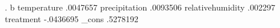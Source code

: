 	.
	b
temperature	.0047657
precipitation	.0093506
relativehumidity	.002297
treatment	-.0436695
_cons	.5278192
